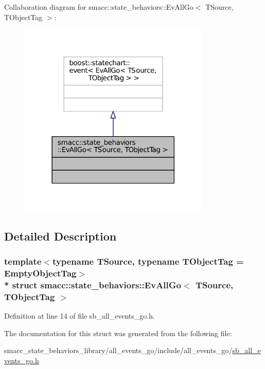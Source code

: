 Collaboration diagram for smacc\+:\+:state\+\_\+behaviors\+:\+:Ev\+All\+Go$<$ T\+Source, T\+Object\+Tag $>$\+:
\nopagebreak
\begin{figure}[H]
\begin{center}
\leavevmode
\includegraphics[width=258pt]{structsmacc_1_1state__behaviors_1_1EvAllGo__coll__graph}
\end{center}
\end{figure}


\subsection{Detailed Description}
\subsubsection*{template$<$typename T\+Source, typename T\+Object\+Tag = Empty\+Object\+Tag$>$\\*
struct smacc\+::state\+\_\+behaviors\+::\+Ev\+All\+Go$<$ T\+Source, T\+Object\+Tag $>$}



Definition at line 14 of file sb\+\_\+all\+\_\+events\+\_\+go.\+h.



The documentation for this struct was generated from the following file\+:\begin{DoxyCompactItemize}
\item 
smacc\+\_\+state\+\_\+behaviors\+\_\+library/all\+\_\+events\+\_\+go/include/all\+\_\+events\+\_\+go/\hyperlink{sb__all__events__go_8h}{sb\+\_\+all\+\_\+events\+\_\+go.\+h}\end{DoxyCompactItemize}
